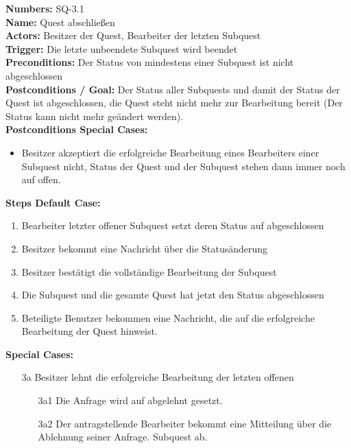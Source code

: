 \documentclass{article}
\begin{document}
\begin{samepage}
\textbf{Numbers:} SQ-3.1\\
\textbf{Name:} Quest abschließen\\
\textbf{Actors:} Besitzer der Quest, Bearbeiter der letzten Subquest\\
\textbf{Trigger:} Die letzte unbeendete Subquest wird beendet\\
\textbf{Preconditions:} Der Status von mindestens einer Subquest ist nicht abgeschlossen\\
\textbf{Postconditions / Goal:} Der Status aller Subquests und damit der Status der Quest ist abgeschlossen, die Quest steht nicht mehr zur Bearbeitung bereit (Der Status kann nicht mehr geändert werden). \\
\textbf{Postconditions Special Cases:} 
\begin{itemize}
    \item Besitzer akzeptiert die erfolgreiche Bearbeitung eines Bearbeiters einer Subquest nicht, Status der Quest und der Subquest stehen dann immer noch auf offen.\\
\end{itemize}
\textbf{Steps Default Case:}
\begin{enumerate}
    \item Bearbeiter letzter offener Subquest setzt deren Status auf abgeschlossen
    \item Besitzer bekommt eine Nachricht über die Statusänderung
    \item Besitzer bestätigt die vollständige Bearbeitung der Subquest
    \item Die Subquest und die gesamte Quest hat jetzt den Status abgeschlossen
    \item Beteiligte Benutzer bekommen eine Nachricht, die auf die erfolgreiche Bearbeitung der Quest hinweist.
\end{enumerate}
\textbf{Special Cases:}
\begin{itemize}
\item [3a] Besitzer lehnt die erfolgreiche Bearbeitung der letzten offenen
\begin{itemize}
    \item [3a1] Die Anfrage wird auf abgelehnt gesetzt.
    \item [3a2] Der antragstellende Bearbeiter bekommt eine Mitteilung über die Ablehnung seiner Anfrage.
    Subquest ab.
\end{itemize}
\end{itemize}
\end{samepage}
\end{document}
